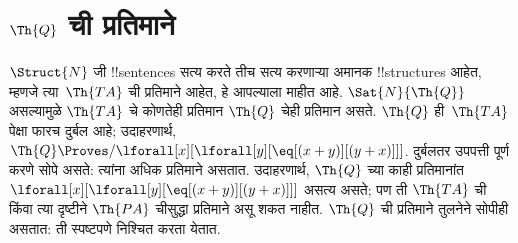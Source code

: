 \documentclass[../../../include/open-logic-section]{subfiles}
\begin{document}
\section{$\Th{Q}$ ची प्रतिमाने}

\begin{explain}
$\Struct{N}$ जी !!{sentence}s सत्य करते तीच सत्य करणाऱ्या अमानक
!!{structure}s आहेत, म्हणजे त्या~$\Th{TA}$ ची प्रतिमाने आहेत, हे आपल्याला
माहीत आहे. $\Sat{N}{\Th{Q}}$ असल्यामुळे $\Th{TA}$ चे कोणतेही प्रतिमान
$\Th{Q}$ चेही प्रतिमान असते. $\Th{Q}$ ही~$\Th{TA}$ पेक्षा फारच दुर्बल
आहे; उदाहरणार्थ, $\Th{Q} \Proves/ \lforall[x][\lforall[y][\eq[(x +
      y)][(y+x)]]]$. दुर्बलतर उपपत्ती पूर्ण करणे सोपे असते: त्यांना अधिक
प्रतिमाने असतात. उदाहरणार्थ, $\Th{Q}$ च्या काही प्रतिमानांत
$\lforall[x][\lforall[y][\eq[(x + y)][(y+x)]]]$ असत्य असते; पण ती
$\Th{TA}$ ची किंवा त्या दृष्टीने $\Th{PA}$ चीसुद्धा प्रतिमाने असू शकत
नाहीत. $\Th{Q}$ ची प्रतिमाने तुलनेने सोपीही असतात: ती स्पष्टपणे निश्चित
करता येतात.
\end{explain}
\end{document}
